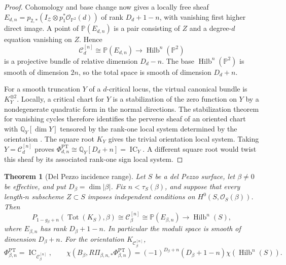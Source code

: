 \documentclass[11pt,reqno]{amsart}
\newtheorem{theorem}{Theorem}[section]
\theoremstyle{definition}
\newcommand{\Q}{\mathbb Q}
\newcommand{\Pp}{\mathbb P}
\newcommand{\Ocal}{\mathcal O}
\newcommand{\IC}{\operatorname{IC}}
\newcommand{\Hilb}{\operatorname{Hilb}}
\newcommand{\Tot}{\operatorname{Tot}}
\newcommand{\PT}{\operatorname{PT}}
\begin{document}
\begin{proof}
Cohomology and base change now gives a locally free sheaf
$E_{d,n}=p_{2,*}(I_{\mathcal Z}\otimes p_1^*\Ocal_{\Pp^2}(d))$ of rank
$D_d+1-n$, with vanishing first higher direct image.  A point of
$\Pp(E_{d,n})$ is a pair consisting of $Z$ and a degree-$d$ equation
vanishing on $Z$.  Hence
\[
  \mathcal C_d^{[n]}\cong\Pp(E_{d,n})
  \longrightarrow\Hilb^n(\Pp^2)
\]
is a projective bundle of relative dimension $D_d-n$.  The base
$\Hilb^n(\Pp^2)$ is smooth of dimension $2n$, so the total space is smooth
of dimension $D_d+n$.

For a smooth truncation $Y$ of a $d$-critical locus, the virtual canonical
bundle is $K_Y^{\otimes2}$.  Locally, a critical chart for $Y$ is a
stabilization of the zero function on $Y$ by a nondegenerate quadratic form
in the normal directions.  The stabilization theorem for vanishing cycles
therefore identifies the perverse sheaf of an oriented chart with
$\Q_Y[\dim Y]$ tensored by the rank-one local system determined by the
orientation \cite[Theorem~6.9]{BBDJS}.  The square root $K_Y$ gives the
trivial orientation local system.  Taking
$Y=\mathcal C_d^{[n]}$ proves
$\Phi_{d,n}^{\PT}\cong\Q_Y[D_d+n]=\IC_Y$.  A different square root would
twist this sheaf by its associated rank-one sign local system.
\end{proof}

\begin{theorem}[Del Pezzo incidence range]
\label{thm:del-pezzo-incidence-range}
Let \(S\) be a del Pezzo surface, let \(\beta\ne0\) be effective, and put
\(D_\beta=\dim|\beta|\).  Fix \(n<\tau_S(\beta)\), and suppose that every
length-\(n\) subscheme \(Z\subset S\) imposes independent conditions on
\(H^0(S,\Ocal_S(\beta))\).  Then
\[
 P_{1-g_\beta+n}(\Tot(K_S),\beta)
 \cong\mathcal C_\beta^{[n]}
 \cong\Pp(E_{\beta,n})\longrightarrow\Hilb^n(S),
\]
where \(E_{\beta,n}\) has rank \(D_\beta+1-n\).  In particular the
moduli space is smooth of dimension \(D_\beta+n\).  For the orientation
\(K_{\mathcal C_\beta^{[n]}}\),
\[
 \Phi_{\beta,n}^{\PT}=\IC_{\mathcal C_\beta^{[n]}},\qquad
 \chi(B_\beta,R\Pi_{\beta,n,*}\Phi_{\beta,n}^{\PT})
 =(-1)^{D_\beta+n}(D_\beta+1-n)\chi(\Hilb^n(S)).
\]
\end{theorem}
\end{document}
